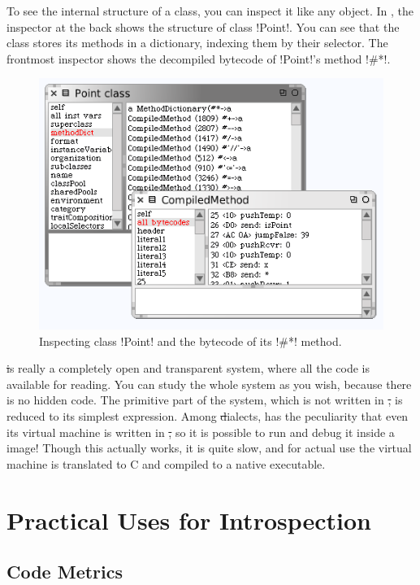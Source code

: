 \documentclass[a4paper,10pt,twoside]{book}
\begin{document}
To see the internal structure of a class, you can inspect it like any object.
In , the inspector at the back shows the structure of class \ct!Point!.
You can see that the class stores its methods in a dictionary, indexing them by their selector.
The frontmost inspector shows the decompiled bytecode of \ct!Point!'s method \ct!#*!.

\begin{figure}[ht]\centering
	\includegraphics[width=.75\linewidth]{CompiledMethod}
	\caption{Inspecting class \ct!Point! and the bytecode of its \ct!\#*! method.\label{fig:CompiledMethod}}
\end{figure}

\st is really a completely open and transparent system, where all the code is available for reading.
You can study the whole system as you wish, because there is no hidden code.
The primitive part of the system, \ie which is not written in \st, is reduced to its simplest expression.
Among \st dialects, \sq has the peculiarity that even its virtual machine is written in \st, so it is possible to run and debug it inside a \sq image!
Though this actually works, it is quite slow, and for actual use the virtual machine is translated to C and compiled to a native executable.



\section{Practical Uses for Introspection} %

\subsection{Code Metrics}
\end{document}
